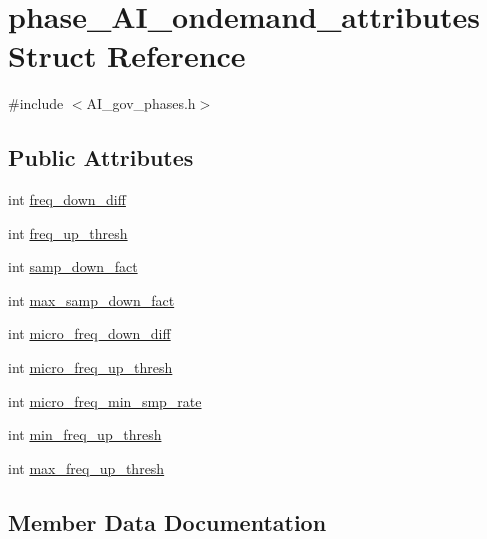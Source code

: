 \hypertarget{structphase__AI__ondemand__attributes}{}\section{phase\+\_\+\+A\+I\+\_\+ondemand\+\_\+attributes Struct Reference}
\label{structphase__AI__ondemand__attributes}


{\ttfamily \#include $<$A\+I\+\_\+gov\+\_\+phases.\+h$>$}

\subsection*{Public Attributes}
\begin{DoxyCompactItemize}
\item 
int \hyperlink{structphase__AI__ondemand__attributes_a0183ce5f3b982624eca93d4dbb3ea241}{freq\+\_\+down\+\_\+diff}
\item 
int \hyperlink{structphase__AI__ondemand__attributes_aff853c71e6abf5fad6801185dd24cfd1}{freq\+\_\+up\+\_\+thresh}
\item 
int \hyperlink{structphase__AI__ondemand__attributes_a927e43a38a3351a8b1e51c7a9b0e7c57}{samp\+\_\+down\+\_\+fact}
\item 
int \hyperlink{structphase__AI__ondemand__attributes_a6ad872936de232da09dacefade6ab2f6}{max\+\_\+samp\+\_\+down\+\_\+fact}
\item 
int \hyperlink{structphase__AI__ondemand__attributes_a60429205c426957982c2210b2bbcd412}{micro\+\_\+freq\+\_\+down\+\_\+diff}
\item 
int \hyperlink{structphase__AI__ondemand__attributes_a8982d06f1c440438dcc72efe585fe3d7}{micro\+\_\+freq\+\_\+up\+\_\+thresh}
\item 
int \hyperlink{structphase__AI__ondemand__attributes_ac2cc6e690a8b9ef7ed9923b8b0204e0b}{micro\+\_\+freq\+\_\+min\+\_\+smp\+\_\+rate}
\item 
int \hyperlink{structphase__AI__ondemand__attributes_a25a454d74fabf8a260c6d9102c61e9e2}{min\+\_\+freq\+\_\+up\+\_\+thresh}
\item 
int \hyperlink{structphase__AI__ondemand__attributes_ac6b1b31514d92ef65f472480f46f98e1}{max\+\_\+freq\+\_\+up\+\_\+thresh}
\end{DoxyCompactItemize}


\subsection{Member Data Documentation}
\mbox{\label{structphase__AI__ondemand__attributes_a0183ce5f3b982624eca93d4dbb3ea241}} 
